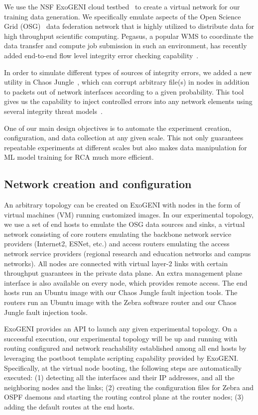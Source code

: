 We use the NSF ExoGENI cloud testbed~\cite{ExoGENI:web} to create a virtual network for our training data generation. We specifically emulate aspects of the Open Science Grid (OSG)~\cite{OSG:web} data federation network that is highly utilized to distribute data for high throughput scientific computing. Pegasus, a popular WMS to coordinate the data transfer and compute job submission in such an environment, has recently added end-to-end flow level integrity error checking capability~\cite{swip:pearc:2019}.    

In order to simulate different types of sources of integrity errors, we added a new utility in Chaos Jungle~\cite{swip:pearc:2019,chaosjungle:web}, which can corrupt arbitrary file(s) in nodes in addition to packets out of network interfaces according to a given probability. This tool gives us the capability to inject controlled errors into any network elements using several integrity threat models~\cite{threat-model}.

One of our main design objectives is to automate the experiment creation, configuration, and data collection at any given scale. This not only guarantees repeatable experiments at different scales but also makes data manipulation for ML model training for RCA much more efficient.    

\subsection{Network creation and configuration}
An arbitrary topology can be created on ExoGENI with nodes in the form of virtual machines (VM) running customized images. In our experimental topology, we use a set of end hosts to emulate the OSG data sources and sinks, a virtual network consisting of core routers emulating the backbone network service providers (Internet2, ESNet, etc.) and access routers emulating the access network service providers (regional research and education networks and campus networks). All nodes are connected with virtual layer-2 links with certain throughput guarantees in the private data plane. An extra management plane interface is also available on every node, which provides remote access. The end hosts run an Ubuntu image with our Chaos Jungle fault injection tools. The routers run an Ubuntu image with the Zebra software router and our Chaos Jungle fault injection tools.

ExoGENI provides an API to launch any given experimental topology. On a successful execution, our experimental topology will be up and running with routing configured and network reachability established among all end hosts by leveraging the postboot template scripting capability provided by ExoGENI. Specifically, at the virtual node booting, the following steps are automatically executed: (1) detecting all the interfaces and their IP addresses, and all the neighboring nodes and the links; (2) creating the configuration files for Zebra and OSPF daemons and starting the routing control plane at the router nodes; (3) adding the default routes at the end hosts.    

